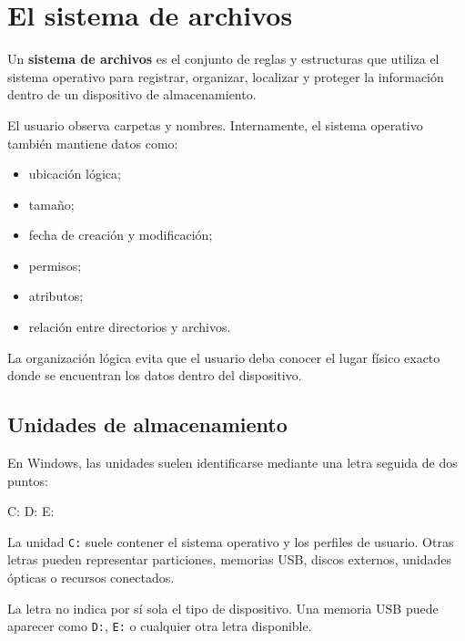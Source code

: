\documentclass[
  spanish,
  letterpaper,
]{scrbook}
\newenvironment{Shaded}{\begin{snugshade}}{\end{snugshade}}
\newcommand{\NormalTok}[1]{\textcolor[rgb]{0.00,0.23,0.31}{#1}}
\providecommand{\tightlist}{%
  \setlength{\itemsep}{0pt}\setlength{\parskip}{0pt}}
\begin{document}

\chapter{El sistema de archivos}\label{el-sistema-de-archivos}

Un \textbf{sistema de archivos} es el conjunto de reglas y estructuras
que utiliza el sistema operativo para registrar, organizar, localizar y
proteger la información dentro de un dispositivo de almacenamiento.

El usuario observa carpetas y nombres. Internamente, el sistema
operativo también mantiene datos como:

\begin{itemize}
\tightlist
\item
  ubicación lógica;
\item
  tamaño;
\item
  fecha de creación y modificación;
\item
  permisos;
\item
  atributos;
\item
  relación entre directorios y archivos.
\end{itemize}

La organización lógica evita que el usuario deba conocer el lugar físico
exacto donde se encuentran los datos dentro del dispositivo.

\section{Unidades de almacenamiento}\label{unidades-de-almacenamiento}

En Windows, las unidades suelen identificarse mediante una letra seguida
de dos puntos:

\begin{Shaded}
\begin{Highlighting}[]
\NormalTok{C:}
\NormalTok{D:}
\NormalTok{E:}
\end{Highlighting}
\end{Shaded}

La unidad \texttt{C:} suele contener el sistema operativo y los perfiles
de usuario. Otras letras pueden representar particiones, memorias USB,
discos externos, unidades ópticas o recursos conectados.

\begin{tcolorbox}[enhanced jigsaw, arc=.35mm, bottomrule=.15mm, bottomtitle=1mm, breakable, colback=white, colbacktitle=quarto-callout-warning-color!10!white, colframe=quarto-callout-warning-color-frame, coltitle=black, left=2mm, leftrule=.75mm, opacityback=0, opacitybacktitle=0.6, rightrule=.15mm, title=\textcolor{quarto-callout-warning-color}{\faExclamationTriangle}\hspace{0.5em}{No confundir}, titlerule=0mm, toprule=.15mm, toptitle=1mm]

La letra no indica por sí sola el tipo de dispositivo. Una memoria USB
puede aparecer como \texttt{D:}, \texttt{E:} o cualquier otra letra
disponible.

\end{tcolorbox}
\end{document}
